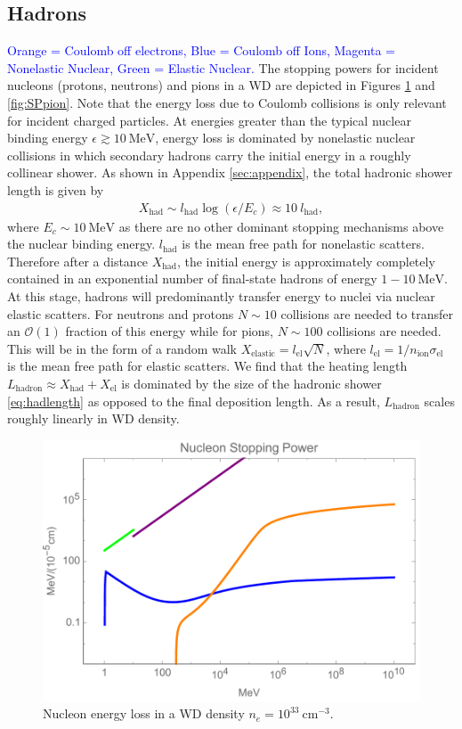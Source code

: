 \documentclass[twocolumn,showpacs,preprintnumbers,amsmath,amssymb,prd]{revtex4}
\newcommand{\OO}{\mathcal{O}}
\begin{document}
\subsection{Hadrons}
\textcolor{blue}{Orange = Coulomb off electrons, Blue = Coulomb off Ions, Magenta = Nonelastic Nuclear, Green = Elastic Nuclear.}
The stopping powers for incident nucleons (protons, neutrons) and pions in a WD are depicted in Figures \ref{fig:SPnuc} and \ref{fig:SPpion}. Note that the energy loss due to Coulomb collisions is only relevant for incident charged particles. At energies greater than the typical nuclear binding energy $\epsilon \gtrsim 10 ~\text{MeV}$, energy loss is dominated by nonelastic nuclear collisions in which secondary hadrons carry the initial energy in a roughly collinear shower. As shown in Appendix \ref{sec:appendix}, the total hadronic shower length is given by
\begin{align}
\label{eq:hadlength}
X_{\text{had}} \sim l_\text{had} \log{(\epsilon/E_c)} \approx 10 ~l_\text{had},
\end{align}
where $E_c \sim 10 ~\text{MeV}$ as there are no other dominant stopping mechanisms above the nuclear binding energy. $l_\text{had}$ is the mean free path for nonelastic scatters. Therefore after a distance $X_\text{had}$, the initial energy is approximately completely contained in an exponential number of final-state hadrons of energy $1 - 10 ~\text{MeV}$. At this stage, hadrons will predominantly transfer energy to nuclei via nuclear elastic scatters. For neutrons and protons $N \sim 10$ collisions are needed to transfer an $\OO(1)$ fraction of this energy while for pions, $N \sim 100$ collisions are needed. This will be in the form of a random walk $X_\text{elastic} = l_\text{el} \sqrt{N}$, where $ l_\text{el} = 1/n_\text{ion} \sigma_\text{el}$ is the mean free path for elastic scatters. We find that the heating length $L_\text{hadron} \approx X_\text{had} + X_\text{el}$ is dominated by the size of the hadronic shower \eqref{eq:hadlength} as opposed to the final deposition length. As a result, $L_\text{hadron}$ scales roughly linearly in WD density. 

\begin{figure}
\includegraphics[scale=.45]{SPnucleon.pdf}
\caption{Nucleon energy loss in a WD density $n_e = 10^{33} ~\text{cm}^{-3}$.}
\label{fig:SPnuc}
\end{figure}
\end{document}
